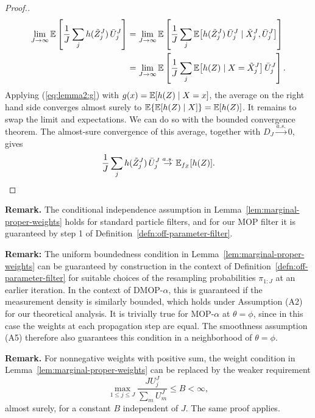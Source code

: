 \documentclass[11pt]{article}
\theoremstyle{thmstylethree}%
\begin{document}
\begin{proof}[Proof.]
\begin{align}
 \lim_{J\to\infty}\mathbb{E}\left[\frac1J\sum_j h(\tilde Z_j^J)\,\bar U_j^J\right]
 &=\lim_{J\to\infty}\mathbb{E}\left[\frac1J\sum_j
 \mathbb{E}\big[h(\tilde Z_j^J)\,\bar U_j^J\mid\tilde X_j^J,\bar U_j^J\big]\right]
 \\
 &=\lim_{J\to\infty}\mathbb{E}\left[\frac1J\sum_j
 \mathbb{E}\big[h(Z)\mid X=\tilde X_j^J\big]\,\bar U_j^J\right].
\end{align}
Applying (\ref{eq:lemma2:g}) with $g(x)=\mathbb{E}[h(Z)\mid X=x]$, the average on the
right hand side converges almost surely to
$\mathbb{E}\{\mathbb{E}[h(Z)\mid X]\}=\mathbb{E}[h(Z)]$.
It remains to swap the limit and expectations. We can do so with the bounded
convergence theorem. The almost-sure convergence of this average,
together with $D_J\stackrel{a.s.}{\to}0$, gives
\begin{equation}
 \frac1J\sum_j h(\tilde Z_j^J)\,\bar U_j^J
 \stackrel{a.s.}{\to}\mathbb{E}_{f_Z}[h(Z)].\qedhere
\end{equation}
\end{proof}

\noindent\textbf{Remark.} The conditional independence assumption in Lemma~\ref{lem:marginal-proper-weights} holds for
standard particle filters, and for our MOP filter it is guaranteed by step 1
of Definition~\ref{defn:off-parameter-filter}. 

\vspace{1mm}

\noindent \textbf{Remark:}  The uniform boundedness condition in Lemma~\ref{lem:marginal-proper-weights} can be guaranteed by construction in the context of Definition~\ref{defn:off-parameter-filter} for suitable choices of the resampling probabilities $\pi_{1:J}$ at an earlier iteration.
In the context of DMOP-$\alpha$, this is guaranteed if the measurement density is similarly bounded, which holds under Assumption (A2) for our theoretical analysis. 
It is trivially true for MOP-$\alpha$ at $\theta=\phi$, since in this case the weights at each propagation step are equal.
The smoothness assumption (A5) therefore also guarantees this condition in a neighborhood of $\theta=\phi$.

\vspace{1mm}

\noindent\textbf{Remark.} For nonnegative weights with positive sum, the weight condition in Lemma~\ref{lem:marginal-proper-weights} can be replaced by the weaker requirement
\[
 \max_{1\le j\le J}\frac{JU_j^J}{\sum_mU_m^J}\le B<\infty,
\]
almost surely, for a constant $B$ independent of $J$. The same proof applies.
\end{document}
